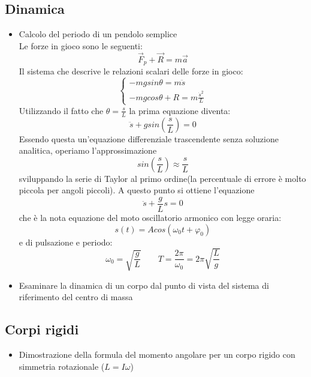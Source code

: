 \subsection*{Dinamica}
\begin{itemize}
    \item Calcolo del periodo di un pendolo semplice \\
    Le forze in gioco sono le seguenti:
    \[
     \vec{F}_p + \vec{R} = m \vec{a}    
    \]
    Il sistema che descrive le relazioni scalari delle forze in gioco:
    \[
    \begin{cases}
        -mg sin\theta = m \ddot{s} \\
        -mg cos \theta + R = m \frac{\dot{s}^2}{L}
    \end{cases}    
    \]
    Utilizzando il fatto che $\theta = \frac{s}{L}$ la prima equazione 
    diventa:
    \[
    \ddot{s} + g sin(\frac{s}{L}) = 0    
    \]
    Essendo questa un'equazione differenziale trascendente senza soluzione
    analitica, operiamo l'approssimazione 
    \[
        sin(\frac{s}{L}) \approx \frac{s}{L}
    \]
    sviluppando la serie di Taylor al primo ordine(la percentuale di errore 
    è molto piccola per angoli piccoli). A questo punto si ottiene l'equazione
    \[
        \ddot{s} + \frac{g}{L}s = 0
    \]
    che è la nota equazione del moto oscillatorio armonico con legge oraria:
    \[
        s(t) = Acos (\omega_0 t + \varphi_0)
    \]
    e di pulsazione e periodo:
    \[
     \omega_0 = \sqrt{\frac{g}{L}}   \qquad 
     T = \frac{2 \pi}{\omega_0} = 2\pi \sqrt{\frac{L}{g}} 
    \]



    \item Esaminare la dinamica di un corpo dal punto di vista del sistema di riferimento del 
    centro di massa

\end{itemize}

\subsection*{Corpi rigidi}
\begin{itemize}
    \item Dimostrazione della formula del momento angolare per un corpo rigido con
    simmetria rotazionale ($L= I \omega$)
\end{itemize}

